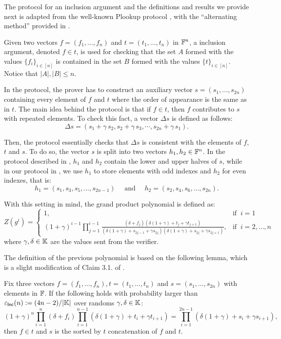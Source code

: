 The protocol for an inclusion argument and the definitions and results we provide next is adapted from the well-known Plookup protocol \cite{EPRINT:GabWil20}, with the ``alternating method''  provided in \cite{EPRINT:PFMBM22}.

Given two vectors $f = (f_1, \dots, f_n)$ and $t = (t_1, \dots, t_n)$ in $\mathbb{F}^n$, a inclusion argument, denoted $f \in t$, is used for checking that the set $A$ formed with the values $\{f_i\}_{i\in[n]}$ is contained in the set $B$ formed with the values $\{t\}_{i\in[n]}$. Notice that $|A|,|B|\leq n$.

In the protocol, the prover has to construct an auxiliary vector $s = (s_1, \dots, s_{2n})$ containing every element of $f$ and $t$ where the order of appearance is the same as in $t$.
The main idea behind the protocol is that if $f \in t$, then $f$ contributes to $s$ with repeated elements.
To check this fact, a vector $\Delta{s}$ is defined as follows:
\[
\Delta{s} = (s_1+\gamma\,s_2, s_2+\gamma\,s_3, \cdots, s_{2n}+\gamma\,s_1).
\]

Then, the protocol essentially checks that $\Delta{s}$ is consistent with the elements of $f$, $t$ and $s$.
To do so, the vector $s$ is split into two vectors $h_1,h_2 \in \mathbb{F}^n$.
In the protocol described in \cite{EPRINT:GabWil20},
$h_1$ and $h_2$ contain the lower and upper halves of $s$, while in our protocol in \cite{EPRINT:PFMBM22}, we use $h_1$ to store elements with odd indexes and $h_2$ for even indexes, that is:
\begin{equation}\label{eq:alternating-method}
h_1 = (s_1, s_3, s_5, ..., s_{2n-1}) \quad\text{ and }\quad
h_2 = (s_2, s_4, s_6, ..., s_{2n}).
\end{equation}

With this setting in mind, the grand product polynomial is defined as:
\[
  Z(g^i) = 
  \begin{cases} 
  1, & \text{if }~ i=1 \\ 
  \displaystyle (1+\gamma)^{i-1}\prod_{j=1}^{i-1}\frac{{(\delta + f_j)}   (\delta(1+\gamma) + t_j + \gamma t_{j+1})}{ (\delta(1+\gamma) + s_{2j-1} + \gamma s_{2j})(\delta(1+\gamma) + s_{2j} + \gamma s_{2j+1})}, & \text{if }~ i = 2, \dots, n
  \end{cases} 
\]
where $\gamma,\delta \in \mathbb{K}$ are the values sent from the verifier.

The definition of the previous polynomial is based on the following lemma, which is a slight modification of Claim 3.1. of \cite{EPRINT:GabWil20}.
\begin{lemma}\label{lemma:inclusion-soundness}
  Fix three vectors $f = (f_1, \dots, f_n),t = (t_1, \dots, t_n)$ and $s = (s_1,\dots,s_{2n})$ with elements in $\mathbb{F}$. If the following holds with probability larger than $\varepsilon_{\textsf{Inc}}(n) := (4n-2)/|\mathbb{K}|$ over randoms $\gamma, \delta \in \mathbb{K}$:
  \begin{equation*}
    (1+\gamma)^n\prod_{i=1}^n (\delta + f_i)\prod_{i=1}^{n-1} (\delta(1+\gamma) + t_i + \gamma t_{i+1}) = \prod_{i=1}^{2n-1} (\delta(1+\gamma) + s_i + \gamma s_{i+1}),
  \end{equation*}
  then $f \in t$ and $s$ is the sorted by $t$ concatenation of $f$ and $t$. 
\end{lemma}

